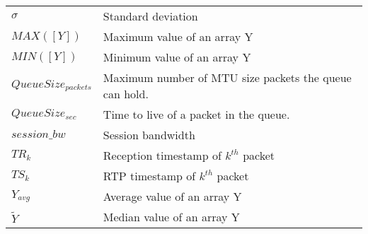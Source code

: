 \begin{longtable}{ll}
$\sigma$	& 	Standard deviation \\
$MAX([Y])$ 	& Maximum value of an array Y \\
$MIN([Y])$ 	& Minimum value of an array Y \\
$QueueSize_{packets}$ & Maximum number of MTU size packets the queue can hold.\\
$QueueSize_{sec}$ & Time to live of a packet in the queue.\\
$session\_bw$	& Session bandwidth \\
$TR_k$ 		& 	Reception timestamp of $k^{th}$ packet \\
$TS_k$ 		& 	RTP timestamp of $k^{th}$ packet \\
$Y_{avg}$   & Average value of an array Y \\
$\widetilde{Y}$ & Median value of an array Y \\

\end{longtable}

